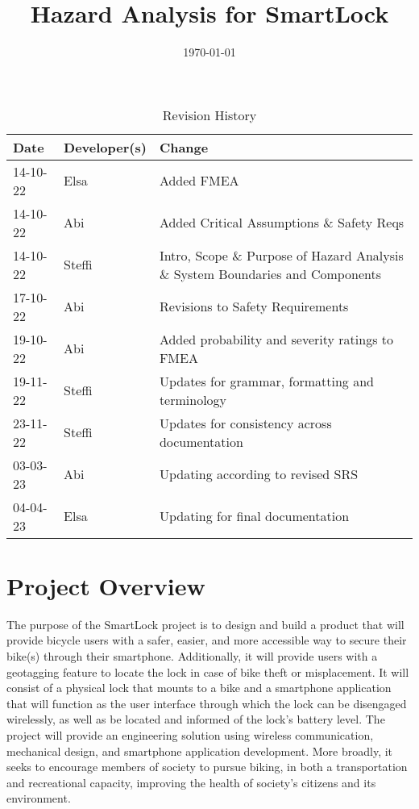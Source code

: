\documentclass{article}
\title{Hazard Analysis for SmartLock\\\progname}
\author{\authname}
\date{\today}
\begin{document}
\maketitle
\thispagestyle{empty}

\newpage
{}

\begin{table}[hp]
\caption{Revision History} \label{TblRevisionHistory}
\begin{tabularx}{\textwidth}{llX}
\toprule
\textbf{Date} & \textbf{Developer(s)} & \textbf{Change}\\
\midrule
14-10-22 & Elsa & Added FMEA\\
14-10-22 & Abi & Added Critical Assumptions \& Safety Reqs\\
14-10-22 & Steffi & Intro, Scope \& Purpose of Hazard Analysis \& System Boundaries and Components\\
17-10-22 & Abi & Revisions to Safety Requirements\\
19-10-22 & Abi & Added probability and severity ratings to FMEA \\
19-11-22 & Steffi & Updates for grammar, formatting and terminology\\
23-11-22 & Steffi & Updates for consistency across documentation\\
03-03-23 & Abi & Updating according to revised SRS\\
04-04-23 & Elsa & Updating for final documentation\\
\bottomrule
\end{tabularx}
\end{table}

\newpage


\tableofcontents

\listoftables

\newpage


\section{Project Overview}

The purpose of the SmartLock project is to design and build a product that will provide bicycle users with a safer, easier, and more accessible way to secure their bike(s) through their smartphone. Additionally, it will provide users with a geotagging feature to locate the lock in case of bike theft or misplacement.  It will consist of a physical lock that mounts to a bike and a smartphone application that will function as the user interface through which the lock can be disengaged wirelessly, as well as be located and informed of the lock's battery level. The project will provide an engineering solution using wireless communication, mechanical design, and smartphone application development. More broadly, it seeks to encourage members of society to pursue biking, in both a transportation and recreational capacity, improving the health of society’s citizens and its environment.  
\end{document}
